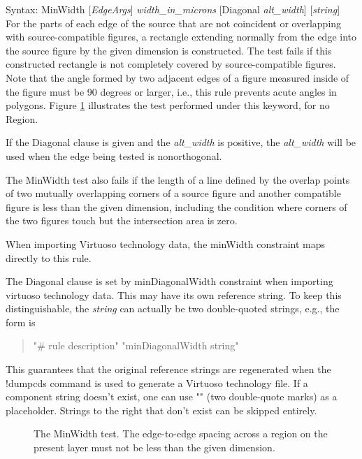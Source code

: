 \begin{description}
\item{Syntax: {\vt MinWidth} [{\it EdgeArgs\/}]
   {\it width\_in\_microns} [{\vt Diagonal} {\it alt\_width\/}]
   [{\it string\/}] }\\

For the parts of each edge of the source that are not coincident or
overlapping with source-compatible figures, a rectangle extending
normally from the edge into the source figure by the given dimension
is constructed.  The test fails if this constructed rectangle is not
completely covered by source-compatible figures.  Note that the angle
formed by two adjacent edges of a figure measured inside of the figure
must be 90 degrees or larger, i.e., this rule prevents acute angles in
polygons.  Figure \ref{drcminwidth} illustrates the test performed
under this keyword, for no {\et Region}.

If the {\vt Diagonal} clause is given and the {\it alt\_width} is
positive, the {\it alt\_width} will be used when the edge being tested
is nonorthogonal.

The {\et MinWidth} test also fails if the length of a line defined by
the overlap points of two mutually overlapping corners of a source
figure and another compatible figure is less than the given dimension,
including the condition where corners of the two figures touch but the
intersection area is zero.

When importing Virtuoso technology data, the {\vt minWidth} constraint
maps directly to this rule.

The {\vt Diagonal} clause is set by {\vt minDiagonalWidth} constraint
when importing virtuoso technology data.  This may have its own
reference string.  To keep this distinguishable, the {\it string} can
actually be two double-quoted strings, e.g., the form is

\begin{quote}\vt
"\# rule description" "minDiagonalWidth string"
\end{quote}

This guarantees that the original reference strings are regenerated
when the {\cb !dumpcds} command is used to generate a Virtuoso
technology file.  If a component string doesn't exist, one can use
{\vt ""} (two double-quote marks) as a placeholder.  Strings to the
right that don't exist can be skipped entirely.
\end{description}

\begin{figure}
\caption{\label{drcminwidth} The {\et MinWidth} test.  The edge-to-edge
spacing across a region on the present layer must not be less than the
given dimension.}
\vspace{1.5ex}
\begin{center}
\end{center}
\end{figure}

